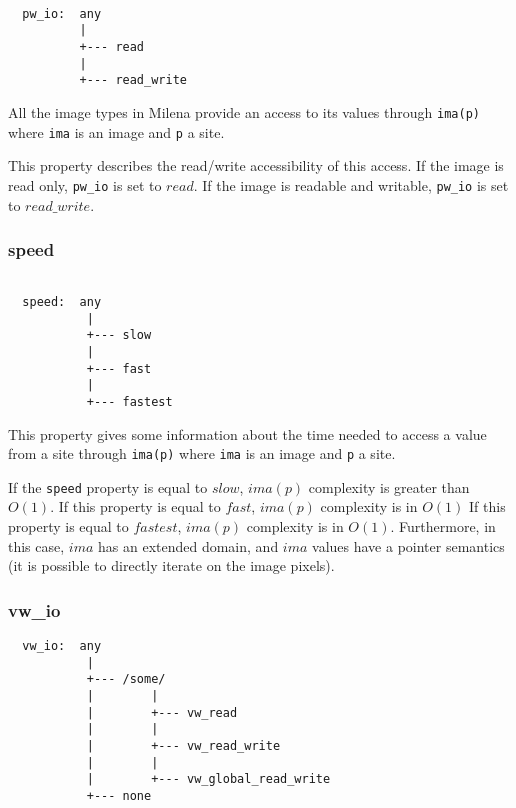\begin{verbatim}

  pw_io:  any
          |
          +--- read
          |
          +--- read_write
\end{verbatim}


All the image types in Milena provide an access to its values through
\verb+ima(p)+ where \verb+ima+ is an image and \verb+p+ a site.

This property describes the read/write accessibility of this access.
If the image is read only, \verb+pw_io+ is set to $read$.
If the image is readable and writable, \verb+pw_io+ is set to $read\_write$.\\



\subsubsection{speed}

\begin{verbatim}

  speed:  any
           |
           +--- slow
           |
           +--- fast
           |
           +--- fastest
\end{verbatim}

  This property gives some information about the time needed to access a
value from a site through \verb+ima(p)+ where \verb+ima+ is an image and
\verb+p+ a site.

If the \verb+speed+ property is equal to $slow$, $ima(p)$ complexity is greater
than $O(1)$.
If this property is equal to $fast$, $ima(p)$ complexity is in
$O(1)$
If this property is equal to $fastest$, $ima(p)$ complexity is
in $O(1)$. Furthermore, in this case, $ima$ has an extended domain, and $ima$
values have a pointer semantics (it is possible to directly iterate on the
image pixels).

\subsubsection{vw\_io}

\begin{verbatim}
  vw_io:  any
           |
           +--- /some/
           |        |
           |        +--- vw_read
           |        |
           |        +--- vw_read_write
           |        |
           |        +--- vw_global_read_write
           +--- none
\end{verbatim}

